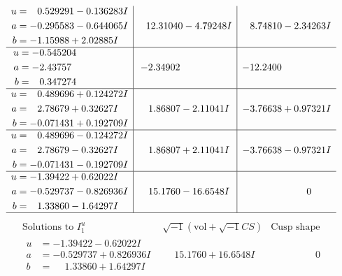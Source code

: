 \documentclass[1p]{elsarticle_modified}
\theoremstyle{definition}
\newcommand{\I}{\sqrt{-1}}
\begin{document}
$$\begin{array}{c|c|c}
\begin{aligned}
u &= \phantom{-}0.529291 - 0.136283 I \\
a &= -0.295583 - 0.644065 I \\
b &= -1.15988 + 2.02885 I\end{aligned}
 & \phantom{-}12.31040 - 4.79248 I & \phantom{-}8.74810 - 2.34263 I \\ \hline\begin{aligned}
u &= -0.545204\phantom{ +0.000000I} \\
a &= -2.43757\phantom{ +0.000000I} \\
b &= \phantom{-}0.347274\phantom{ +0.000000I}\end{aligned}
 & -2.34902\phantom{ +0.000000I} & -12.2400\phantom{ +0.000000I} \\ \hline\begin{aligned}
u &= \phantom{-}0.489696 + 0.124272 I \\
a &= \phantom{-}2.78679 + 0.32627 I \\
b &= -0.071431 + 0.192709 I\end{aligned}
 & \phantom{-}1.86807 - 2.11041 I & -3.76638 + 0.97321 I \\ \hline\begin{aligned}
u &= \phantom{-}0.489696 - 0.124272 I \\
a &= \phantom{-}2.78679 - 0.32627 I \\
b &= -0.071431 - 0.192709 I\end{aligned}
 & \phantom{-}1.86807 + 2.11041 I & -3.76638 - 0.97321 I \\ \hline\begin{aligned}
u &= -1.39422 + 0.62022 I \\
a &= -0.529737 - 0.826936 I \\
b &= \phantom{-}1.33860 - 1.64297 I\end{aligned}
 & \phantom{-}15.1760 - 16.6548 I & \phantom{-0.000000 } 0\\
 \hline 
 \end{array}$$\newpage$$\begin{array}{c|c|c}  
\text{Solutions to }I^u_{1}& \I (\text{vol} + \sqrt{-1}CS) & \text{Cusp shape}\\
 \hline 
\begin{aligned}
u &= -1.39422 - 0.62022 I \\
a &= -0.529737 + 0.826936 I \\
b &= \phantom{-}1.33860 + 1.64297 I\end{aligned}
 & \phantom{-}15.1760 + 16.6548 I & \phantom{-0.000000 } 0 \\ \hline\begin{aligned}

\end{aligned}
\end{array}$$
\end{document}
